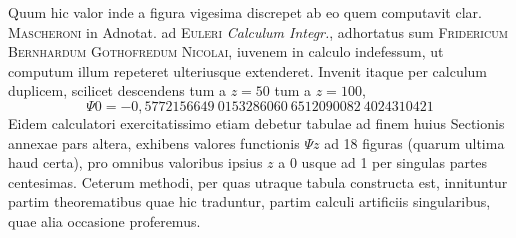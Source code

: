 \expandafter\def\csname HistoricalNoteText18\endcsname{Quum hic valor inde a figura vigesima discrepet ab eo quem computavit clar. \textsc{Mascheroni} in Adnotat. ad \textsc{Euleri} \textit{Calculum Integr.}, adhortatus sum \textsc{Fridericum Bernhardum Gothofredum Nicolai}, iuvenem in calculo indefessum, ut computum illum repeteret ulteriusque extenderet. Invenit itaque per calculum duplicem, scilicet descendens tum a $z=50$ tum a $z=100$,
\[
\Psi0=-0{,}5772156649\ 0153286060\ 6512090082\ 4024310421
\]
Eidem calculatori exercitatissimo etiam debetur tabulae ad finem huius Sectionis annexae pars altera, exhibens valores functionis $\Psi z$ ad 18 figuras (quarum ultima haud certa), pro omnibus valoribus ipsius $z$ a 0 usque ad 1 per singulas partes centesimas. Ceterum methodi, per quas utraque tabula constructa est, innituntur partim theorematibus quae hic traduntur, partim calculi artificiis singularibus, quae alia occasione proferemus.}
